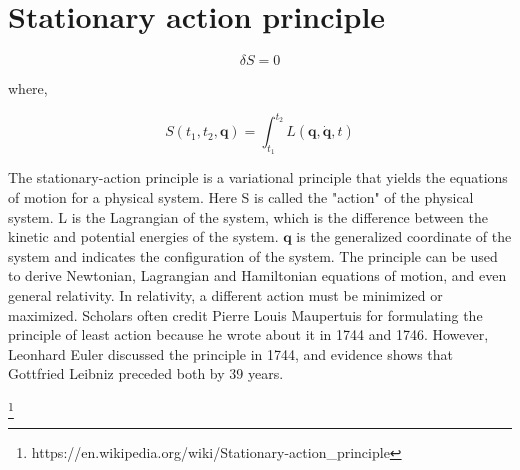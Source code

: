 \section{Stationary action principle}

\begin{equation}
    \delta S = 0
\end{equation}

where,

\begin{equation}
    S(t_1, t_2, \mathbf{q}) = \int_{t_1}^{t_2}{L(\mathbf{q}, \mathbf{\dot{q}}, t)}
\end{equation}

The stationary-action principle is a variational principle that yields the equations of motion for a physical system. Here S is called the "action" of the physical system. L is the Lagrangian of the system, which is the difference between the kinetic and potential energies of the system. $\mathbf{q}$ is the generalized coordinate of the system and indicates the configuration of the system. The principle can be used to derive Newtonian, Lagrangian and Hamiltonian equations of motion, and even general relativity. In relativity, a different action must be minimized or maximized. Scholars often credit Pierre Louis Maupertuis for formulating the principle of least action because he wrote about it in 1744 and 1746. However, Leonhard Euler discussed the principle in 1744, and evidence shows that Gottfried Leibniz preceded both by 39 years.

\footnote{https://en.wikipedia.org/wiki/Stationary-action_principle}

